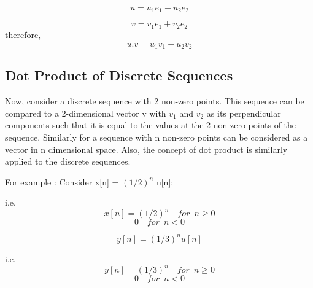 				\begin{equation*}u = u_1e_1 + u_2e_2\end{equation*}
                        
                        \begin{equation*}v = v_1e_1 + v_2e_2\end{equation*} 
\noindent                        
                        therefore,\begin{equation*} u.v = u_1v_1 + u_2v_2\end{equation*}
           
\subsection{Dot Product of Discrete Sequences}           
Now, consider a discrete sequence with 2 non-zero points. This sequence can be compared to a 2-dimensional vector v with $v_1$ and $v_2$ as its perpendicular components such that it is equal to the values at the 2 non zero points of the sequence. Similarly for a sequence with n non-zero points can be considered as a vector in n dimensional space. Also, the concept of dot product is similarly applied to the discrete sequences.

For example : Consider
	x[n] = $(1/2)^n$ u[n];
    
    i.e.
     \begin{equation*}
    x[n] = (1/2)^n	\enspace	\enspace for\enspace	 n\geq0\end{equation*}
    \begin{equation*}	 0	\enspace  \enspace	 for\enspace	 n<0\end{equation*}
               
	 \begin{equation*} y[n] = (1/3)^nu[n] \end{equation*}
    
    i.e. 
    \begin{equation*}y[n] = (1/3)^n	\enspace \enspace	for\enspace n\geq0\end{equation*} \begin{equation*}0\enspace \enspace			for\enspace n<0 \end{equation*}
                  
